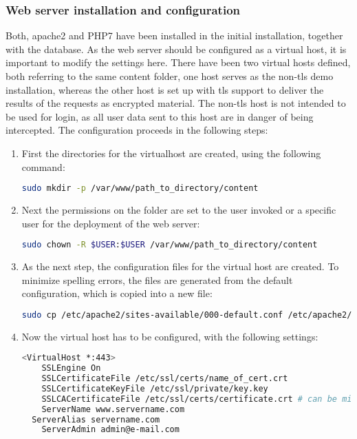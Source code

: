 \subsubsection{Web server installation and configuration}
Both, apache2 and PHP7 have been installed in the initial installation, together with the database. As the web server should be configured as a virtual host, it is important to 
modify the settings here. There have been two virtual hosts defined, both referring to the same content folder, one host serves as the non-tls demo installation, whereas the other
host is set up with tls support to deliver the results of the requests as encrypted material. The non-tls host is not intended to be used for login, as all user data sent to this host
are in danger of being intercepted. The configuration proceeds in the following steps:
\begin{enumerate}
 \item First the directories for the virtualhost are created, using the following command:
 \begin{lstlisting}[language=bash]
  sudo mkdir -p /var/www/path_to_directory/content
 \end{lstlisting}
 \item Next the permissions on the folder are set to the user invoked or a specific user for the deployment of the web server:
 \begin{lstlisting}[language=bash]
  sudo chown -R $USER:$USER /var/www/path_to_directory/content
 \end{lstlisting}
 \item As the next step, the configuration files for the virtual host are created. To minimize spelling errors, the files are generated from the default configuration, which is 
 copied into a new file:
 \begin{lstlisting}[language=bash]
  sudo cp /etc/apache2/sites-available/000-default.conf /etc/apache2/sites-available/name_virtual_host.conf
 \end{lstlisting}
 \item Now the virtual host has to be configured, with the following settings:
 \begin{lstlisting}[language=bash]
  <VirtualHost *:443>
	SSLEngine On
	SSLCertificateFile /etc/ssl/certs/name_of_cert.crt
	SSLCertificateKeyFile /etc/ssl/private/key.key
	SSLCACertificateFile /etc/ssl/certs/certificate.crt # can be missing, depending on tls configuration of the server
	ServerName www.servername.com
  ServerAlias servername.com
	ServerAdmin admin@e-mail.com

\end{lstlisting}
\end{enumerate}
